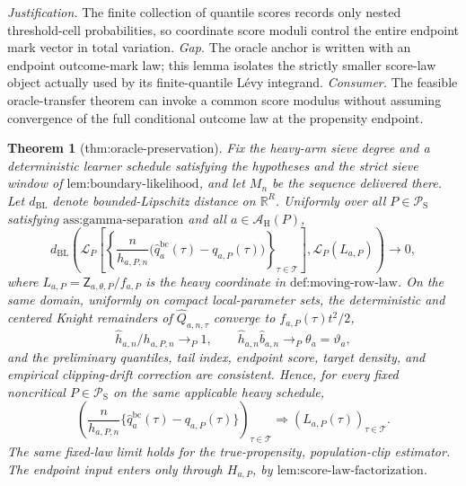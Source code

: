 \documentclass{article}
\newtheorem{theorem}{Theorem}
\begin{document}
\par\smallskip\noindent \textit{Justification.} The finite collection of quantile scores records only nested threshold-cell probabilities, so coordinate score moduli control the entire endpoint mark vector in total variation. \textit{Gap.} The oracle anchor is written with an endpoint outcome-mark law; this lemma isolates the strictly smaller score-law object actually used by its finite-quantile Lévy integrand. \textit{Consumer.} The feasible oracle-transfer theorem can invoke a common score modulus without assuming convergence of the full conditional outcome law at the propensity endpoint.

\begin{theorem}[thm:oracle-preservation]\label{thm:oracle-preservation}
Fix the heavy-arm sieve degree and a deterministic learner schedule satisfying the hypotheses and the strict sieve window of \(\text{lem:boundary-likelihood}\), and let \(M_n\) be the sequence delivered there.  Let \(d_{\mathrm{BL}}\) denote bounded-Lipschitz distance on \(\mathbb R^R\).  Uniformly over all \(P\in\mathcal P_{\mathrm S}\) satisfying \(\text{ass:gamma-separation}\) and all \(a\in\mathcal A_{\mathrm H}(P)\),
\[
d_{\mathrm{BL}}\!\left(
\mathcal L_P\!\left[\left\{\frac{n}{h_{a,P,n}}
\bigl(\widehat q_a^{\mathrm{bc}}(\tau)-q_{a,P}(\tau)\bigr)\right\}_{\tau\in\mathcal T}\right],
\mathcal L_P(L_{a,P})\right)\longrightarrow0,
\]
where \(L_{a,P}=\mathsf Z_{a,\theta,P}/f_{a,P}\) is the heavy coordinate in \(\text{def:moving-row-law}\).  On the same domain, uniformly on compact local-parameter sets, the deterministic and centered Knight remainders of \(\widehat Q_{a,n,\tau}\) converge to \(f_{a,P}(\tau)t^2/2\),
\[
\widehat h_{a,n}/h_{a,P,n}\to_P1,
\qquad
\widehat h_{a,n}\widehat b_{a,n}\to_P\theta_a=\vartheta_a,
\]
and the preliminary quantiles, tail index, endpoint score, target density, and empirical clipping-drift correction are consistent.  Hence, for every fixed noncritical \(P\in\mathcal P_{\mathrm S}\) on the same applicable heavy schedule,
\[
\left(\frac{n}{h_{a,P,n}}
\{\widehat q_a^{\mathrm{bc}}(\tau)-q_{a,P}(\tau)\}\right)_{\tau\in\mathcal T}
\Rightarrow (L_{a,P}(\tau))_{\tau\in\mathcal T}.
\]
The same fixed-law limit holds for the true-propensity, population-clip estimator.  The endpoint input enters only through \(H_{a,P}\), by \(\text{lem:score-law-factorization}\).
\end{theorem}
\end{document}
